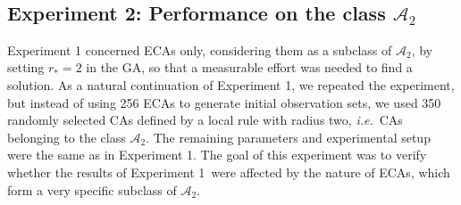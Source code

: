 \begin{table}[ht]
	\centering
	\caption{ECAs requiring the smallest \protect{} and the largest \protect{} number of iterations of the GA in Experiment 1.}\label{tab:exp1-rest}
	\
\end{table}

\subsection{Experiment 2: Performance on the class $\mathcal{A}_2$}

Experiment 1 concerned ECAs only, considering them as a subclass of $\mathcal{A}_2$, by setting $r_\ast = 2$ in the GA, so that a measurable effort was needed to find a solution. As a natural continuation of Experiment 1, we repeated the experiment, but instead of using 256 ECAs to generate initial observation sets, we used 350 randomly selected CAs defined by a local rule with radius two, \emph{i.e.}\ CAs belonging to the class $\mathcal{A}_2$. The remaining parameters and experimental setup were the same as in Experiment 1. The goal of this experiment was to verify whether the results of Experiment 1~were affected by the nature of ECAs, which form a very specific subclass of $\mathcal{A}_2$.

